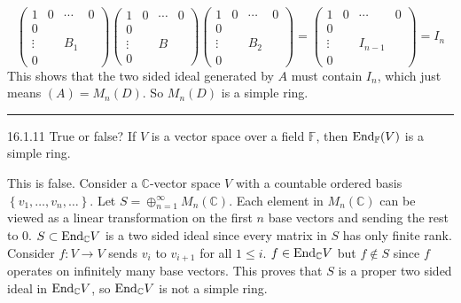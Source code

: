 \documentclass[a4paper, 12pt]{article}
\begin{document}
\begin{solution}
\[\begin{pmatrix}
    1 & 0 &\cdots & 0\\ 
    0 &   &       &   \\ 
    \vdots & & B_1 &  \\ 
    0 & & &
\end{pmatrix}\begin{pmatrix}
    1 & 0 &\cdots & 0\\ 
    0 &   &       &   \\ 
    \vdots & & B &  \\ 
    0 & & &
\end{pmatrix}\begin{pmatrix}
    1 & 0 &\cdots & 0\\ 
    0 &   &       &   \\ 
    \vdots & & B_2 &  \\ 
    0 & & &
\end{pmatrix}=\begin{pmatrix}
    1 & 0 &\cdots & 0\\ 
    0 &   &       &   \\ 
    \vdots & & I_{n-1} &  \\ 
    0 & & &
\end{pmatrix}=I_n\]
This shows that the two sided ideal generated by \(A\) must contain \(I_n\), which just means \((A)=M_n(D)\). So \(M_n(D)\) is a simple ring.  
\end{solution}

\noindent\rule{7in}{2.8pt}
\begin{problem}{16.1.11}
True or false? If \(V\) is a vector space over a field \(\mathbb{F}\), then \(\text{End}_{\mathbb{F}}(V)\) is a simple ring.
\end{problem}
\begin{solution}
This is false. Consider a \(\mathbb{C}\)-vector space \(V\) with a countable ordered basis \(\left\{ v_1,\ldots,v_n,\ldots \right\}\). Let \(S=\oplus_{n=1}^{\infty} M_n(\mathbb{C})\). Each element in 
\(M_n(\mathbb{C})\) can be viewed as a linear transformation on the first \(n\) base vectors and sending the rest to \(0\). \(S\subset \text{End}_{\mathbb{C}}V\) is a two sided ideal since every matrix in \(S\) has only finite rank. Consider \(f:V\rightarrow V\) sends 
\(v_i\) to \(v_{i+1}\) for all \(1\leq i\). \(f\in \text{End}_{\mathbb{C}}V\) but \(f\notin S\) since \(f\) operates on infinitely many base vectors. This proves that \(S\) is a proper two sided ideal in \(\text{End}_{\mathbb{C}}V\), so \(\text{End}_{\mathbb{C}}V\) is not a 
simple ring. 
\end{solution}
\end{document}
